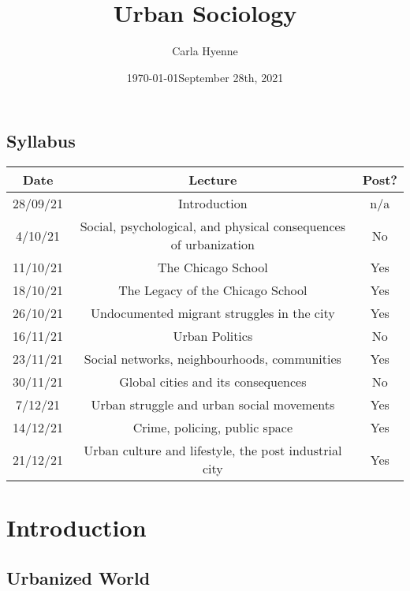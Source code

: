 \documentclass{article}
\title{Urban Sociology}
\author{Carla Hyenne }
\date{\today}
\begin{document}
\maketitle

\tableofcontents

\subsection{Syllabus}

\begin{tabular}{|c|c|c|}
	\hline
	Date & Lecture & Post? \\ 
	 \hline
	28/09/21 & Introduction & n/a  \\  
	 \hline
	4/10/21 & Social, psychological, and physical consequences of urbanization & No \\   
	 \hline
	 11/10/21 & The Chicago School & Yes \\
	 \hline
	 18/10/21 & The Legacy of the Chicago School & Yes \\   
	 \hline
	 26/10/21 & Undocumented migrant struggles in the city & Yes  \\   
	  \hline
	 16/11/21 & Urban Politics &  No \\   
	 \hline
	 23/11/21 & Social networks, neighbourhoods, communities & Yes  \\   
	 \hline
	 30/11/21 & Global cities and its consequences & No  \\   
	  \hline
	 7/12/21 & Urban struggle and urban social movements & Yes  \\   
	 \hline
	 14/12/21 & Crime, policing, public space &  Yes \\   
	 \hline
	 21/12/21 & Urban culture and lifestyle, the post industrial city & Yes \\ 
	 \hline
\end{tabular}

\pagebreak


\section{Introduction}
\date{September 28th, 2021}

\subsection{Urbanized World}
\end{document}
